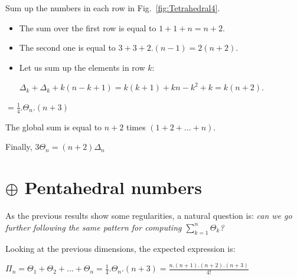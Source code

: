 Sum up the numbers in each row in Fig.~\ref{fig:Tetrahedral4}.
\begin{itemize}
\item 
The sum over the first row is equal to $1+1+n = n+2$.
\item
The second one is equal to $3 + 3 + 2.(n-1) = 2(n+2)$. 
\item
Let us sum up the elements in row $k$: 

$\Delta_k + \Delta_k + k(n-k+1)  = k(k+1) + kn-k^2+k = k(n+2)$.
\end{itemize}
$= \frac{1}{4}.\Theta_n.(n+3)$

The global sum is equal to $n+2$ times $(1+2+...+n)$.

Finally, $3 \Theta_n = (n+2) \Delta_n$
\medskip

\noindent {}


\section{$\oplus$ Pentahedral numbers}

As the previous results show some regularities, a natural question is: \textit{can we go further following the same pattern for computing 
$ \sum_{k=1}^{n} \Theta_k$?}
\medskip

Looking at the previous dimensions, the expected expression is:

$\Pi_n = \Theta_1 + \Theta_2 + ... + \Theta_n = \frac{1}{4}.\Theta_n.(n+3) = \frac{n.(n+1).(n+2).(n+3)}{4!} $

